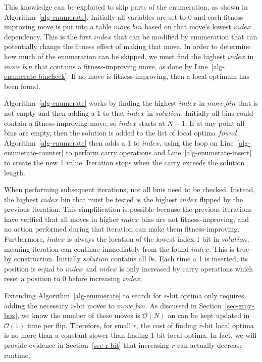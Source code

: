 \documentclass[runningheads,a4paper]{llncs}
\newcommand{\BigO}[1]{$\mathcal{O}{(#1)}$}
\begin{document}
This knowledge can be exploited to skip parts of the enumeration,
as shown in Algorithm~\ref{alg-enumerate}.
Initially all variables are set to 0 and
each fitness-improving move is put into a table $move\_bin$
based on that move's lowest $index$ dependency. This is the first $index$ that
can be modified by enumeration that can potentially change the fitness effect of making that move.
In order to determine how much of the enumeration can be skipped, we must find
the highest $index$ in $move\_bin$ that contains a fitness-improving move,
as done by Line~\ref{alg-enumerate-bincheck}. If no move is fitness-improving,
then a local optimum has been found.

Algorithm~\ref{alg-enumerate} works by finding the highest $index$ in $move\_bin$
that is not empty and then adding a 1 to that $index$ in $solution$. Initially
all bins could contain a fitness-improving move, so $index$ starts at $N-1$.
If at any point all bins are empty, then the solution is added to the list of
local optima $found$. Algorithm~\ref{alg-enumerate} then
adds a 1 to $index$, using the loop on Line~\ref{alg-enumerate-counter}
to perform carry operations and Line~\ref{alg-enumerate-insert} to create the new 1 value.
Iteration stops when the carry exceeds the solution length.

When performing subsequent iterations, not all bins need to be checked. Instead, the highest $index$
bin that must be tested is the highest $index$ flipped by the previous iteration. This
simplification is possible because
the previous iterations have verified that all moves in higher $index$ bins are not fitness-improving, and no action performed during
that iteration can make them fitness-improving.
Furthermore, $index$ is always the location of the lowest index 1 bit in $solution$, meaning
iteration can continue immediately from the found $index$. This is true by construction.
Initially $solution$ contains all 0s. Each time a 1 is inserted, its position is equal to $index$ and
$index$ is only increased by carry operations which reset a position to 0 before increasing $index$.

Extending Algorithm~\ref{alg-enumerate} to search for $r$-bit optima only requires adding the
necessary $r$-bit moves to $move\_bin$. As discussed in Section~\ref{sec-gray-box}, we know the number of these moves
is \BigO{N} an can be kept updated in \BigO{1} time per flip. Therefore, for small $r$, the cost
of finding $r$-bit local optima is no more than a constant slower than finding 1-bit local optima.
In fact, we will provide evidence in Section~\ref{sec-r-bit} that increasing $r$ can actually
decrease runtime.
\end{document}
